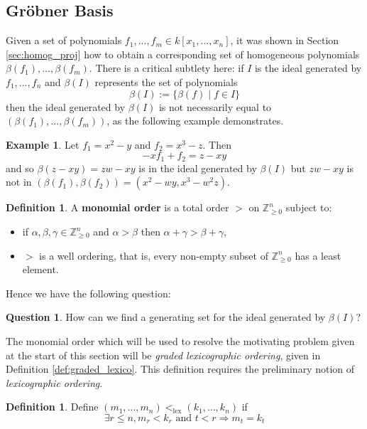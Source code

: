 \documentclass[12pt]{article}
\theoremstyle{plain}
\theoremstyle{definition}
\newtheorem{defn}[thm]{Definition} %
\newtheorem{question}[thm]{Question}
\newtheorem{example}[thm]{Example}
\newcommand{\bb}[1]{\mathbb{#1}}
\begin{document}
\subsection{Gr\"{o}bner Basis}
Given a set of polynomials $f_1,...,f_m \in k[x_1,...,x_n]$, it was shown in Section \ref{sec:homog_proj} how to obtain a corresponding set of homogeneous polynomials $\beta(f_1),...,\beta(f_m)$. There is a critical subtlety here: if $I$ is the ideal generated by $f_1,...,f_n$ and $\beta(I)$ represents the set of polynomials
\begin{equation}\label{eq:beta_I}
    \beta(I) := \lbrace \beta(f) \mid f \in I\rbrace
\end{equation}
then the ideal generated by $\beta(I)$ is not necessarily equal to $(\beta(f_1),...,\beta(f_m))$, as the following example demonstrates.
\begin{example}\label{ex:beta_induced}
Let $f_1 = x^2 - y$ and $f_2 = x^3 - z$. Then
\begin{equation}
    -x f_1 + f_2 = z - xy
\end{equation}
and so $\beta(z - xy) = zw - xy$ is in the ideal generated by $\beta(I)$ but $zw - xy$ is not in $(\beta(f_1),\beta(f_2)) = (x^2 - wy, x^3 - w^2z)$.
\end{example}
\begin{defn}
A \textbf{monomial order} is a total order $>$ on $\bb{Z}_{\geq 0}^n$ subject to:
\begin{itemize}
    \item if $\alpha, \beta, \gamma \in \bb{Z}_{\geq 0}^n$ and $\alpha > \beta$ then $\alpha + \gamma > \beta + \gamma$,
    \item $>$ is a well ordering, that is, every non-empty subset of $\bb{Z}_{\geq 0}^n$ has a least element.
\end{itemize}
Hence we have the following question:
\begin{question}\label{question:why_grobner}
	How can we find a generating set for the ideal generated by $\beta(I)$?
	\end{question}
\end{defn}\label{def:leading_term}
The monomial order which will be used to resolve the motivating problem given at the start of this section will be \emph{graded lexicographic ordering}, given in Definition \ref{def:graded_lexico}. This definition requires the preliminary notion of \emph{lexicographic ordering}.
\begin{defn}\label{def:lexico}
	Define $(m_1,\hdots, m_n) <_{\operatorname{lex}} (k_1,\hdots, k_n)$ if
	\begin{equation}
		\exists r \leq n, m_r < k_r\text{ and }t < r \Longrightarrow m_t = k_t
		\end{equation}
	\end{defn}
\end{document}
